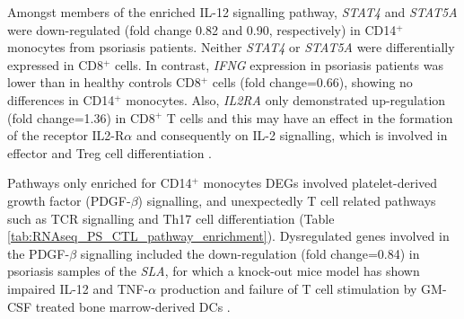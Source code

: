 
Amongst members of the enriched IL-12 signalling pathway, \textit{STAT4} and \textit{STAT5A} were down-regulated (fold change 0.82 and 0.90, respectively) in CD14$^+$ monocytes from psoriasis patients. Neither \textit{STAT4} or \textit{STAT5A} were differentially expressed in CD8$^+$ cells. In contrast, \textit{IFNG} expression in psoriasis patients was lower than in healthy controls CD8$^+$ cells (fold change=0.66), showing no differences in CD14$^+$ monocytes. Also, \textit{IL2RA} only demonstrated up-regulation (fold change=1.36) in CD8$^+$ T cells and this may have an effect in the formation of the receptor IL2-R$\alpha$ and consequently on IL-2 signalling, which is involved in effector and Treg cell differentiation \parencite{Malek2010}.

Pathways only enriched for CD14$^+$ monocytes DEGs involved platelet-derived growth factor (PDGF-$\beta$) signalling, and unexpectedly T cell related pathways such as TCR signalling and Th17 cell differentiation (Table \ref{tab:RNAseq_PS_CTL_pathway_enrichment}). Dysregulated genes involved in the PDGF-$\beta$ signalling included the down-regulation (fold change=0.84) in psoriasis samples of the \textit{SLA}, for which a knock-out mice model has shown impaired IL-12 and TNF-$\alpha$ production and failure of T cell stimulation by GM-CSF treated bone marrow-derived DCs \parencite{Liontos2011}.

